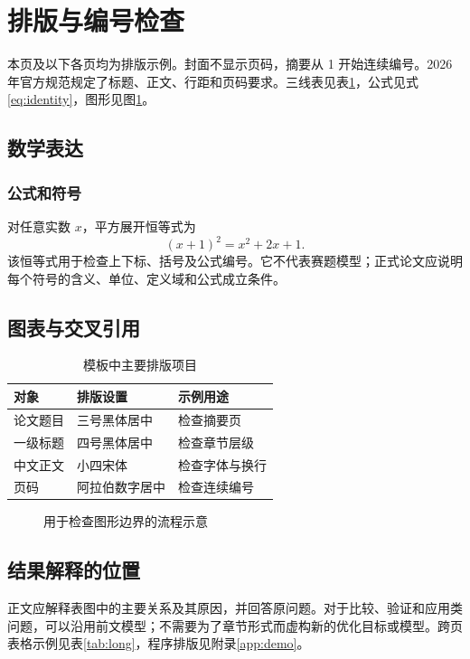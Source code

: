 \section{排版与编号检查}
本页及以下各页均为排版示例。封面不显示页码，摘要从 1 开始连续编号。2026 年官方规范规定了标题、正文、行距和页码要求\cite{format2026}。三线表见表\ref{tab:layout}，公式见式\eqref{eq:identity}，图形见图\ref{fig:route}。
\subsection{数学表达}
\subsubsection{公式和符号}
对任意实数 $x$，平方展开恒等式为
\begin{equation}
  (x+1)^2=x^2+2x+1.\label{eq:identity}
\end{equation}
该恒等式用于检查上下标、括号及公式编号。它不代表赛题模型；正式论文应说明每个符号的含义、单位、定义域和公式成立条件。
\subsection{图表与交叉引用}
\begin{table}[!htbp]\centering
\caption{模板中主要排版项目}\label{tab:layout}
\begin{tabular}{lll}\toprule
对象 & 排版设置 & 示例用途\\\midrule
论文题目 & 三号黑体居中 & 检查摘要页\\
一级标题 & 四号黑体居中 & 检查章节层级\\
中文正文 & 小四宋体 & 检查字体与换行\\
页码 & 阿拉伯数字居中 & 检查连续编号\\\bottomrule
\end{tabular}\end{table}
\begin{figure}[!htbp]\centering
{}
\caption{用于检查图形边界的流程示意}\label{fig:route}
\end{figure}
\subsection{结果解释的位置}
正文应解释表图中的主要关系及其原因，并回答原问题。对于比较、验证和应用类问题，可以沿用前文模型；不需要为了章节形式而虚构新的优化目标或模型。跨页表格示例见表\ref{tab:long}，程序排版见附录\ref{app:demo}。
\clearpage
